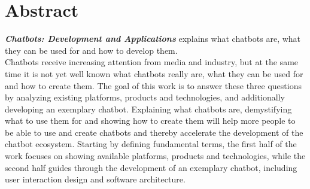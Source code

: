 \chapter*{Abstract}

\emph{\textbf{Chatbots: Development and Applications}} explains what chatbots are, what they can be used for and how to develop them.
\\

Chatbots receive increasing attention from media and industry,
but at the same time it is not yet well known what chatbots really are, what they can be used for and how to create them.
The goal of this work is to answer these three questions by analyzing existing platforms, products and technologies,
and additionally developing an exemplary chatbot.
Explaining what chatbots are, demystifying what to use them for and showing how to create them
will help more people to be able to use and create chatbots and thereby accelerate the development of the chatbot ecosystem.
Starting by defining fundamental terms,
the first half of the work focuses on showing available platforms, products and technologies,
while the second half guides through the development of an exemplary chatbot, including user interaction design and software architecture.
